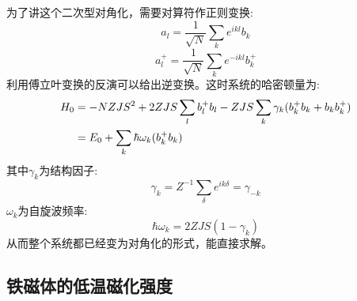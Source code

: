 为了讲这个二次型对角化，需要对算符作正则变换:
\[a_l=\frac{1}{\sqrt{N}}\sum_k e^{ikl}b_k\]
\[a_l^+=\frac{1}{\sqrt{N}}\sum_k e^{-ikl}b_k^+\]
利用傅立叶变换的反演可以给出逆变换。这时系统的哈密顿量为:
\begin{align*}
\notag H_0&=-NZJS^2+2ZJS\sum_lb_l^+b_l-ZJS\sum_k\gamma_k(b_k^+b_k+b_kb_k^+)\\
&=E_0+\sum_k\hbar\omega_k(b_k^+b_k)
\end{align*}
其中$\gamma_k$为结构因子:
\[\gamma_k=Z^{-1}\sum_{\delta}e^{ik\delta}=\gamma_{-k}\]
$\omega_k$为自旋波频率:
\[\hbar\omega_k=2ZJS(1-\gamma_k)\]
从而整个系统都已经变为对角化的形式，能直接求解。\par

\subsection{铁磁体的低温磁化强度}
